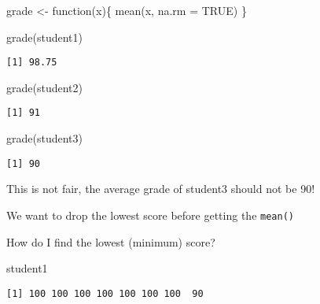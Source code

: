\documentclass[
  letterpaper,
  DIV=11,
  numbers=noendperiod]{scrartcl}
\newenvironment{Shaded}{\begin{snugshade}}{\end{snugshade}}
\newcommand{\AttributeTok}[1]{\textcolor[rgb]{0.40,0.45,0.13}{#1}}
\newcommand{\ConstantTok}[1]{\textcolor[rgb]{0.56,0.35,0.01}{#1}}
\newcommand{\ControlFlowTok}[1]{\textcolor[rgb]{0.00,0.23,0.31}{#1}}
\newcommand{\FunctionTok}[1]{\textcolor[rgb]{0.28,0.35,0.67}{#1}}
\newcommand{\NormalTok}[1]{\textcolor[rgb]{0.00,0.23,0.31}{#1}}
\newcommand{\OtherTok}[1]{\textcolor[rgb]{0.00,0.23,0.31}{#1}}
\begin{document}
\begin{Shaded}
\begin{Highlighting}[]
\NormalTok{grade }\OtherTok{\textless{}{-}} \ControlFlowTok{function}\NormalTok{(x)\{}
  \FunctionTok{mean}\NormalTok{(x, }\AttributeTok{na.rm =} \ConstantTok{TRUE}\NormalTok{)}
\NormalTok{\}}
\end{Highlighting}
\end{Shaded}

\begin{Shaded}
\begin{Highlighting}[]
\FunctionTok{grade}\NormalTok{(student1)}
\end{Highlighting}
\end{Shaded}

\begin{verbatim}
[1] 98.75
\end{verbatim}

\begin{Shaded}
\begin{Highlighting}[]
\FunctionTok{grade}\NormalTok{(student2)}
\end{Highlighting}
\end{Shaded}

\begin{verbatim}
[1] 91
\end{verbatim}

\begin{Shaded}
\begin{Highlighting}[]
\FunctionTok{grade}\NormalTok{(student3)}
\end{Highlighting}
\end{Shaded}

\begin{verbatim}
[1] 90
\end{verbatim}

This is not fair, the average grade of student3 should not be 90!

We want to drop the lowest score before getting the \texttt{mean()}

How do I find the lowest (minimum) score?

\begin{Shaded}
\begin{Highlighting}[]
\NormalTok{student1}
\end{Highlighting}
\end{Shaded}

\begin{verbatim}
[1] 100 100 100 100 100 100 100  90
\end{verbatim}
\end{document}
